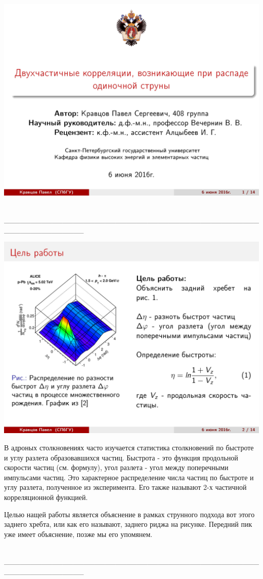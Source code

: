 \documentclass[14pt]{article}
\renewcommand{\line}{\\ \_\_\_\_\_\_\_\_\_\_\_\_\_\_\_\_\_\_\_\_\_\_\_\_\_\_\_\_\_\_\_\_\_\_\_\_\_\_\_\_\_\_\_\_\_\_\_\_\_\_\_\_\_\_\_\_\_\_\_\_\_\_\_ \\ }
\begin{document}
$$$$
$$$$
$$$$
$$$$

\begin{minipage}[h]{0.5\linewidth}
\includegraphics[width=1\linewidth]{page-01.jpg}
\end{minipage}
\begin{minipage}[h]{0.45\linewidth}
\end{minipage}
\line

\begin{minipage}[h]{0.5\linewidth}
\includegraphics[width=1\linewidth]{page-02.jpg}
\end{minipage}
\begin{minipage}[h]{0.45\linewidth}
В адроных столкновениях часто изучается статистика столкновений по быстроте и углу разлета образовавшихся частиц. Быстрота - это функция продольной скорости частиц (см. формулу), угол разлета - угол между поперечными импульсами частиц. Это характерное распределение числа частиц по быстроте и углу разлета, полученное из эксперимента. Его также называют 2-х частичной корреляционной функцией.

Целью нащей работы является объяснение в рамках струнного подхода вот этого заднего хребта, или как его называют, заднего риджа на рисунке. Передний пик уже имеет объяснение, позже мы его упомянем.
\end{minipage}
\line
\end{document}
